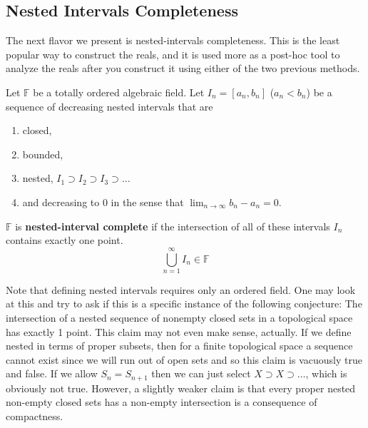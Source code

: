 \subsection{Nested Intervals Completeness}

  The next flavor we present is nested-intervals completeness.  This is the least popular way to construct the reals, and it is used more as a post-hoc tool to analyze the reals after you construct it using either of the two previous methods. 

  \begin{definition}
    Let $\mathbb{F}$ be a totally ordered algebraic field. Let $I_n= [a_n, b_n]$ ($a_n < b_n$) be a sequence of decreasing nested intervals that are 
    \begin{enumerate}
      \item closed, 
      \item bounded, 
      \item nested, $I_1 \supset I_2 \supset I_3 \supset \ldots$ 
      \item and decreasing to $0$ in the sense that $\lim_{n \to \infty} b_n - a_n = 0$. 
    \end{enumerate}
    $\mathbb{F}$ is \textbf{nested-interval complete} if the intersection of all of these intervals $I_n$ contains exactly one point. 
    \begin{equation}
      \bigcup_{n=1}^\infty I_n \in \mathbb{F}
    \end{equation}
  \end{definition}

  Note that defining nested intervals requires only an ordered field. One may look at this and try to ask if this is a specific instance of the following conjecture: The intersection of a nested sequence of nonempty closed sets in a topological space has exactly 1 point. This claim may not even make sense, actually. If we define nested in terms of proper subsets, then for a finite topological space a sequence cannot exist since we will run out of open sets and so this claim is vacuously true and false. If we allow $S_n = S_{n+1}$ then we can just select $X \supset X \supset \ldots$, which is obviously not true. However, a slightly weaker claim is that every proper nested non-empty closed sets has a non-empty intersection is a consequence of compactness. 

